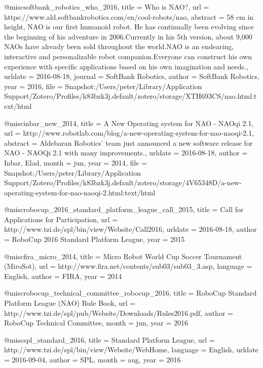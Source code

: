 {{@misc{softbank_robotics_who_2016,
	title = {Who is {NAO}?},
	url = {https://www.ald.softbankrobotics.com/en/cool-robots/nao},
	abstract = {58 cm in height, NAO is our first humanoid robot. He has continually been evolving since the beginning of his adventure in 2006.Currently in his 5th version, about 9,000 NAOs have already been sold throughout the world.NAO is an endearing, interactive and personalizable robot companion.Everyone can construct his own experience with specific applications based on his own imagination and needs.},
	urldate = {2016-08-18},
	journal = {SoftBank Robotics},
	author = {SoftBank Robotics},
	year = {2016},
	file = {Snapshot:/Users/peter/Library/Application Support/Zotero/Profiles/k83bzk3j.default/zotero/storage/XTH693CS/nao.html:text/html}
}

@misc{inbar_new_2014,
	title = {A {New} {Operating} system for {NAO} - {NAOqi} 2.1},
	url = {http://www.robotlab.com/blog/a-new-operating-system-for-nao-naoqi-2.1},
	abstract = {Aldebaran Robotics' team just announced a new software release for NAO - NAOQi 2.1 with many improvements.},
	urldate = {2016-08-18},
	author = {Inbar, Elad},
	month = jun,
	year = {2014},
	file = {Snapshot:/Users/peter/Library/Application Support/Zotero/Profiles/k83bzk3j.default/zotero/storage/4V65348D/a-new-operating-system-for-nao-naoqi-2.html:text/html}
}

@misc{robocup_2016_standard_platform_league_call_2015,
	title = {Call for {Applications} for {Participation}},
	url = {http://www.tzi.de/spl/bin/view/Website/Call2016},
	urldate = {2016-08-18},
	author = {RoboCup 2016 Standard Platform League},
	year = {2015}
}

@misc{fira_micro_2014,
	title = {Micro {Robot} {World} {Cup} {Soccer} {Tournament} ({MiroSot})},
	url = {http://www.fira.net/contents/sub03/sub03_3.asp},
	language = {English},
	author = {FIRA},
	year = {2014}
}

@misc{robocup_technical_committee_robocup_2016,
	title = {{RoboCup} {Standard} {Platform} {League} ({NAO}) {Rule} {Book}},
	url = {http://www.tzi.de/spl/pub/Website/Downloads/Rules2016.pdf},
	author = {RoboCup Technical Committee},
	month = jun,
	year = {2016}
}

@misc{spl_standard_2016,
	title = {Standard {Platform} {League}},
	url = {http://www.tzi.de/spl/bin/view/Website/WebHome},
	language = {English},
	urldate = {2016-09-04},
	author = {SPL},
	month = aug,
	year = {2016}
}

}}
